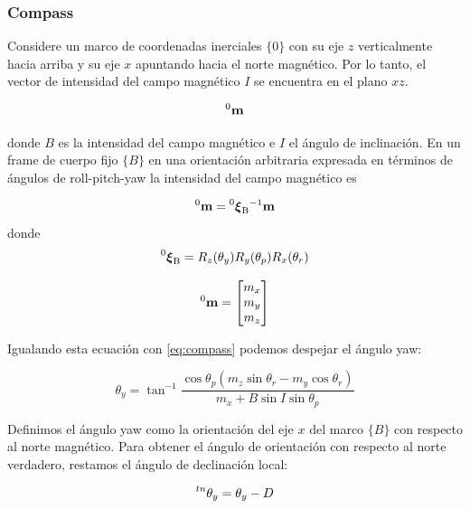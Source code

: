 \begin{frame}
    \frametitle{Compass}
    \scriptsize
    Considere un marco de coordenadas inerciales $\{ 0 \}$ con su eje $z$ verticalmente hacia arriba y su eje $x$ apuntando hacia el norte magnético. Por lo tanto, el vector de intensidad del campo magnético $I$ se encuentra en el plano $xz$.

    \begin{equation*}
        \toCoord{\vec{m}}{0}
    \end{equation*}

    donde $B$ es la intensidad del campo magnético e $I$ el ángulo de inclinación. En un frame de cuerpo fijo $\{ B \}$ en una orientación arbitraria expresada en términos de ángulos de roll-pitch-yaw la intensidad del campo magnético es

    \begin{equation}
        \label{eq:compass}
        \toCoord{\vec{m}}{0} = \transform{0}{B}^{-1} \vec{m}
    \end{equation}
    donde
    \begin{equation*}
        \transform{0}{B} = R_{z}(\theta_{y}) R_{y}(\theta_{p}) R_{x}(\theta_{r})
    \end{equation*}

    \begin{equation*}
    \toCoord{\vec{m}}{0} =
    \begin{bmatrix}
        m_{x} \\
        m_{y} \\
        m_{z}
    \end{bmatrix}
    \end{equation*}

    Igualando esta ecuación con \ref{eq:compass} podemos despejar el ángulo yaw:

    \begin{equation*}
        \theta_{y} = \tan^{-1} \dfrac{\cos \theta_{p}  \left( m_{z} \sin \theta_{r} - m_{y} \cos \theta_{r} \right)} {m_{x} + B \sin I \sin \theta_{p}}
    \end{equation*}

    Definimos el ángulo yaw como la orientación del eje $x$ del marco $\{ B \}$ con respecto al norte magnético. Para obtener el ángulo de orientación con respecto al norte verdadero, restamos el ángulo de declinación local:

    \begin{equation*}
        \prescript{tn}{}{\theta_{y}} = \theta_{y} - D
    \end{equation*}

\end{frame}
